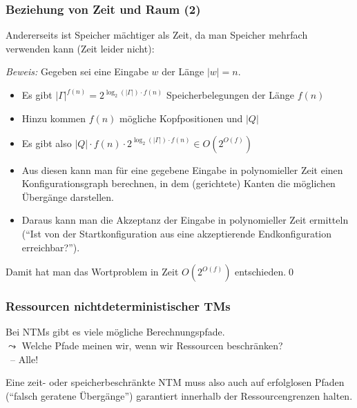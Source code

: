 \documentclass[aspectratio=1610,onlymath]{beamer}
\begin{document}
\begin{frame}\frametitle{Beziehung von Zeit und Raum (2)}

Andererseits ist Speicher mächtiger als Zeit, da man Speicher mehrfach verwenden kann (Zeit leider nicht):\bigskip


\pause\emph{Beweis:} Gegeben sei eine Eingabe $w$ der Länge $|w|=n$.\pause
{\footnotesize
\begin{itemize}
\item Es gibt $|\Gamma|^{f(n)}=2^{\log_2(|\Gamma|)\cdot f(n)}$ Speicherbelegungen der Länge $f(n)$\pause
\item Hinzu kommen $f(n)$ mögliche Kopfpositionen und $|Q|$ \pause
\item Es gibt also $|Q|\cdot f(n)\cdot 2^{\log_2(|\Gamma|)\cdot f(n)}\in O(2^{O(f)})$
\pause
\item Aus diesen kann man für eine gegebene Eingabe in polynomieller Zeit einen \alert{Konfigurationsgraph} berechnen, in dem (gerichtete) Kanten die möglichen Übergänge darstellen.\pause
\item Daraus kann man die Akzeptanz der Eingabe in polynomieller Zeit ermitteln ("`Ist von der Startkonfiguration aus eine akzeptierende Endkonfiguration erreichbar?"').
\end{itemize}}
Damit hat man das Wortproblem in Zeit $O(2^{O(f)})$ entschieden.\qed
\end{frame}


\begin{frame}\frametitle{Ressourcen nichtdeterministischer TMs}

Bei NTMs gibt es viele mögliche Berechnungspfade.\\
$\leadsto$ Welche Pfade meinen wir, wenn wir Ressourcen beschränken?\\\pause
~\hfill{\alert{-- Alle!}}
\medskip


Eine zeit- oder speicherbeschränkte NTM muss also auch auf erfolglosen Pfaden ("`falsch geratene Übergänge"') garantiert
innerhalb der Ressourcengrenzen halten.

\end{frame}
\end{document}
